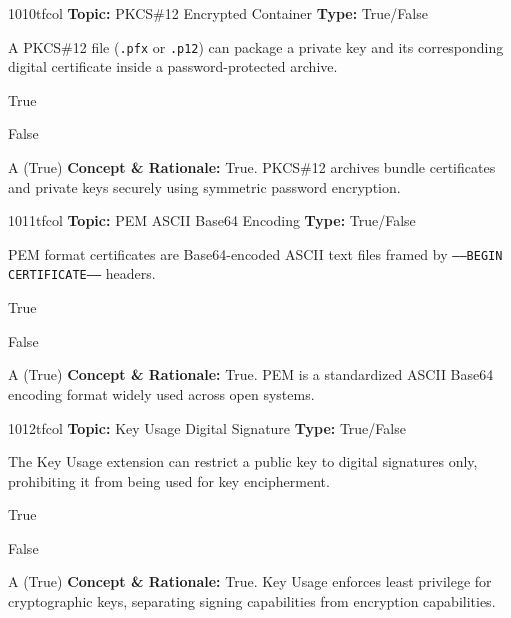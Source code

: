 \begin{qcard}{1010}{tfcol}
\textcolor{darkslate!75}{\small\textbf{Topic:} PKCS\#12 Encrypted Container \hfill \textbf{Type:} True/False}\vspace{0.4em}\par
A PKCS\#12 file (\texttt{.pfx} or \texttt{.p12}) can package a private key and its corresponding digital certificate inside a password-protected archive.
\begin{qoptions}
\item True
\item False
\end{qoptions}
\end{qcard}
\nopagebreak
\begin{explainbox}{A (True)}
\textbf{Concept \& Rationale:} True. PKCS\#12 archives bundle certificates and private keys securely using symmetric password encryption.
\end{explainbox}

\begin{qcard}{1011}{tfcol}
\textcolor{darkslate!75}{\small\textbf{Topic:} PEM ASCII Base64 Encoding \hfill \textbf{Type:} True/False}\vspace{0.4em}\par
PEM format certificates are Base64-encoded ASCII text files framed by \texttt{-----BEGIN CERTIFICATE-----} headers.
\begin{qoptions}
\item True
\item False
\end{qoptions}
\end{qcard}
\nopagebreak
\begin{explainbox}{A (True)}
\textbf{Concept \& Rationale:} True. PEM is a standardized ASCII Base64 encoding format widely used across open systems.
\end{explainbox}

\begin{qcard}{1012}{tfcol}
\textcolor{darkslate!75}{\small\textbf{Topic:} Key Usage Digital Signature \hfill \textbf{Type:} True/False}\vspace{0.4em}\par
The Key Usage extension can restrict a public key to digital signatures only, prohibiting it from being used for key encipherment.
\begin{qoptions}
\item True
\item False
\end{qoptions}
\end{qcard}
\nopagebreak
\begin{explainbox}{A (True)}
\textbf{Concept \& Rationale:} True. Key Usage enforces least privilege for cryptographic keys, separating signing capabilities from encryption capabilities.
\end{explainbox}

